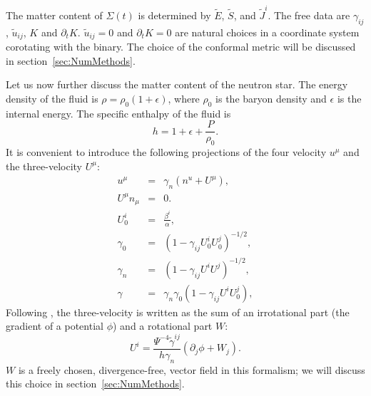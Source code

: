 The matter content of $\Sigma(t)$ is determined by $\tilde{E}$,
$\tilde{S}$, and $\tilde{J}^i$. The free data are $\gamma_{ij}$,
$\tilde{u}_{ij}$, $K$ and $\partial_t K$. $\tilde{u}_{ij}=0$ and
$\partial_t K=0$ are natural choices in a coordinate system corotating
with the binary. The
choice of the conformal metric will be discussed in section~\ref{sec:NumMethods}.

Let us now further discuss the matter content of the neutron star. The
energy density of the fluid is $\rho=\rho_0\left(1+\epsilon\right)$,
where $\rho_0$ is the baryon density and $\epsilon$ is the internal
energy. The specific enthalpy of the fluid is
\begin{equation}
h=1+\epsilon+\frac{P}{\rho_0}.
\end{equation}
It is convenient to introduce the following projections of the four
velocity $u^{\mu}$ and the three-velocity $U^{\mu}$:
\begin{eqnarray}
u^{\mu} &=& \gamma_n\left(n^u+U^\mu\right), \\
U^{\mu}n_{\mu}&=&0.\\
U^i_0 &=& \frac{\beta^i}{\alpha}, \\
\gamma_0 &=& \left(1 - \gamma_{ij}U^i_0U^j_0\right)^{-1/2}, \\
\gamma_n &=& \left(1 - \gamma_{ij}U^iU^j\right)^{-1/2}, \\
\gamma &=& \gamma_n\gamma_0\left(1-\gamma_{ij}U^iU^j_0\right), 
\end{eqnarray}
Following \cite{Tichy:2011gw}, the three-velocity is written as the sum
of an irrotational part (the gradient of a potential $\phi$) and a
rotational part $W$:
\begin{equation}
U^i =
\frac{\Psi^{-4}\tilde{\gamma}^{ij}}{h\gamma_n}\left(\partial_j\phi+W_j\right).
\end{equation}
$W$ is a freely chosen, divergence-free, vector field in this formalism; we will discuss this choice in section~\ref{sec:NumMethods}.

